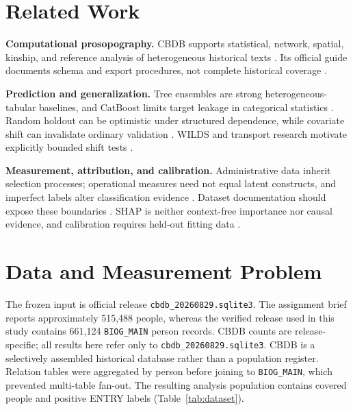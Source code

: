 \documentclass[sigconf]{acmart}
\begin{document}
\section{Related Work}
\textbf{Computational prosopography.} CBDB supports statistical, network, spatial, kinship, and reference analysis of heterogeneous historical texts \cite{tsui2020harvesting,chenwang2022cbdb,fullerwang2021networks,bol2012gis}. Its official guide documents schema and export procedures, not complete historical coverage \cite{fuller2024}.

\textbf{Prediction and generalization.} Tree ensembles are strong heterogeneous-tabular baselines, and CatBoost limits target leakage in categorical statistics \cite{grinsztajn2022tabular,prokhorenkova2018catboost}. Random holdout can be optimistic under structured dependence, while covariate shift can invalidate ordinary validation \cite{roberts2017cv,sugiyama2007covariate}. WILDS and transport research motivate explicitly bounded shift tests \cite{koh2021wilds,subbaswamy2019transport}.

\textbf{Measurement, attribution, and calibration.} Administrative data inherit selection processes; operational measures need not equal latent constructs, and imperfect labels alter classification evidence \cite{hand2018administrative,jacobs2021measurement,frenay2014label}. Dataset documentation should expose these boundaries \cite{gebru2021datasheets}. SHAP is neither context-free importance nor causal evidence, and calibration requires held-out fitting data \cite{lundberg2017shap,kumar2020shap,niculescu2005probabilities,guo2017calibration}.

\section{Data and Measurement Problem}
The frozen input is official release \texttt{cbdb\_20260829.sqlite3}. The assignment brief reports approximately 515,488 people, whereas the verified release used in this study contains 661,124 \texttt{BIOG\_MAIN} person records. CBDB counts are release-specific; all results here refer only to \texttt{cbdb\_20260829.sqlite3}. CBDB is a selectively assembled historical database rather than a population register. Relation tables were aggregated by person before joining to \texttt{BIOG\_MAIN}, which prevented multi-table fan-out. The resulting analysis population contains \NPeople{} covered people and \NEntry{} positive ENTRY labels (Table~\ref{tab:dataset}).
\end{document}
